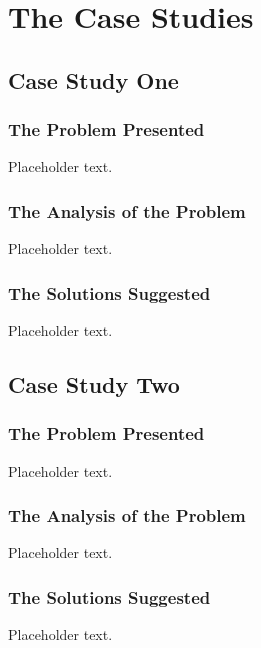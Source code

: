 
\chapter{The Case Studies}

\section{Case Study One}

\subsection{The Problem Presented}

Placeholder text.

\subsection{The Analysis of the Problem}

Placeholder text.

\subsection{The Solutions Suggested}

Placeholder text.

\section{Case Study Two}

\subsection{The Problem Presented}

Placeholder text.

\subsection{The Analysis of the Problem}

Placeholder text.

\subsection{The Solutions Suggested}

Placeholder text.

